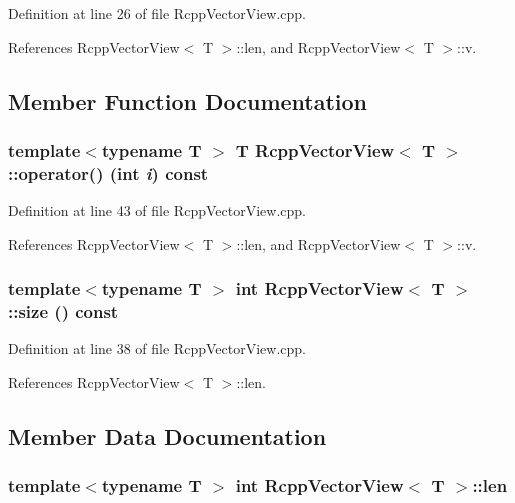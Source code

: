 Definition at line 26 of file RcppVectorView.cpp.

References RcppVectorView$<$ T $>$::len, and RcppVectorView$<$ T $>$::v.

\subsection{Member Function Documentation}
\hypertarget{classRcppVectorView_a13d63e990363a37ae29e0eab7400d297}{
\subsubsection[{operator()}]{\setlength{\rightskip}{0pt plus 5cm}template$<$typename T $>$ T {\bf RcppVectorView}$<$ T $>$::operator() (int {\em i}) const}}
\label{classRcppVectorView_a13d63e990363a37ae29e0eab7400d297}


Definition at line 43 of file RcppVectorView.cpp.

References RcppVectorView$<$ T $>$::len, and RcppVectorView$<$ T $>$::v.\hypertarget{classRcppVectorView_ad4c0f21296eb1cf7b2e2c8b8b43f4b0d}{
\subsubsection[{size}]{\setlength{\rightskip}{0pt plus 5cm}template$<$typename T $>$ int {\bf RcppVectorView}$<$ T $>$::size () const}}
\label{classRcppVectorView_ad4c0f21296eb1cf7b2e2c8b8b43f4b0d}


Definition at line 38 of file RcppVectorView.cpp.

References RcppVectorView$<$ T $>$::len.

\subsection{Member Data Documentation}
\hypertarget{classRcppVectorView_ada67f9b1481099e4a820deaf4648778b}{
\subsubsection[{len}]{\setlength{\rightskip}{0pt plus 5cm}template$<$typename T $>$ int {\bf RcppVectorView}$<$ T $>$::{\bf len}}}
\label{classRcppVectorView_ada67f9b1481099e4a820deaf4648778b}


